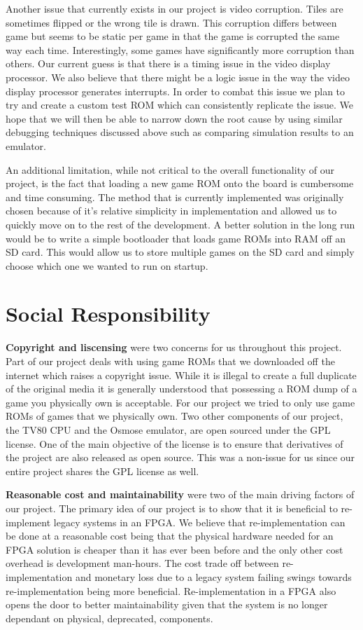 \documentclass{article}
\begin{document}
Another issue that currently exists in our project is video corruption. Tiles are
sometimes flipped or the wrong tile is drawn. This corruption differs between game
but seems to be static per game in that the game is corrupted the same way each
time. Interestingly, some games have significantly more corruption than others.
Our current guess is that there is a timing issue in the video display
processor. We also believe that there might be a logic issue in the way the
video display processor generates interrupts. In order to combat this issue we
plan to try and create a custom test ROM which can consistently replicate the
issue.  We hope that we will then be able to narrow down the root cause by
using similar debugging techniques discussed above such as comparing simulation
results to an emulator.

An additional limitation, while not critical to the overall functionality of
our project, is the fact that loading a new game ROM onto the board is
cumbersome and time consuming. The method that is currently implemented was
originally chosen because of it's relative simplicity in implementation and
allowed us to quickly move on to the rest of the development.  A better
solution in the long run would be to write a simple bootloader that loads game
ROMs into RAM off an SD card. This would allow us to store multiple games on
the SD card and simply choose which one we wanted to run on startup.

\section{Social Responsibility}

\textbf{Copyright and liscensing} were two concerns for us throughout this
project.  Part of our project deals with using game ROMs that we downloaded off
the internet which raises a copyright issue. While it is illegal to create a
full duplicate of the original media it is generally understood that possessing
a ROM dump of a game you physically own is acceptable. For our project we tried
to only use game ROMs of games that we physically own. Two other components of
our project, the TV80 CPU and the Osmose emulator, are open sourced under the
GPL license. One of the main objective of the license is to ensure that
derivatives of the project are also released as open source. This was a
non-issue for us since our entire project shares the GPL license as well.

\textbf{Reasonable cost and maintainability} were two of the main driving
factors of our project. The primary idea of our project is to show that it is
beneficial to re-implement legacy systems in an FPGA. We believe that
re-implementation can be done at a reasonable cost being that the physical
hardware needed for an FPGA solution is cheaper than it has ever been before
and the only other cost overhead is development man-hours. The cost trade off
between re-implementation and monetary loss due to a legacy system failing
swings towards re-implementation being more beneficial. Re-implementation in a
FPGA also opens the door to better maintainability given that the system is no
longer dependant on physical, deprecated, components.
\end{document}
